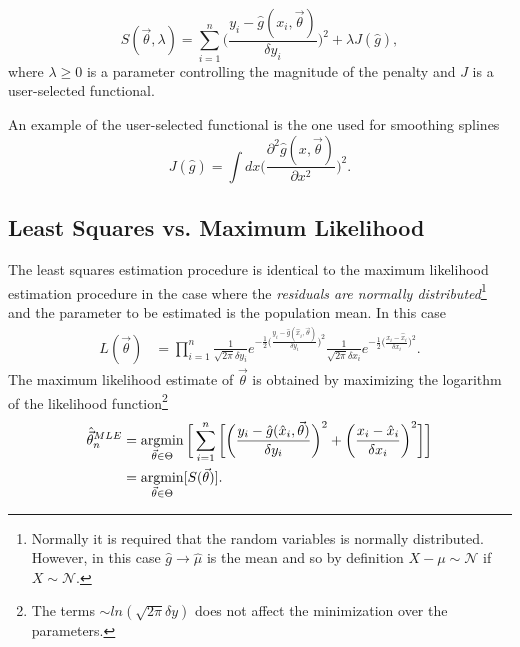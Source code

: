 \begin{equation}
	S(\vec{\theta},\lambda)=\sum_{i=1}^n\bigg(\frac{y_i-\hat{g}(x_i,\vec{\theta})}{\delta y_i}\bigg)^2+\lambda J(\hat{g}),
	\label{eq8p}
\end{equation} 
where $\lambda\geq 0$ is a parameter controlling the magnitude of the penalty and $J$ is a user-selected functional.
\begin{example}
	An example of the user-selected functional is the one used for smoothing splines
	\begin{equation}
		J(\hat{g})=\int dx \bigg(\frac{\partial ^2 \hat{g}(x,\vec{ \theta})}{\partial x^2}\bigg)^2.
	\end{equation}
\end{example}


\subsection{Least Squares vs. Maximum Likelihood}
The least squares estimation procedure is identical to the maximum likelihood estimation procedure in the case where the \emph{residuals are normally distributed}\footnote{Normally it is required that the random variables is normally distributed. However, in this case $\hat{g}\rightarrow \hat{\mu}$ is the mean and so by definition $X-\mu\sim \mathcal{N}$ if $X\sim \mathcal{N}$.} and the parameter to be estimated is the population mean. In this case
\begin{equation}
	\begin{split}
		L(\vec{\theta})&=\prod_{i=1}^n\frac{1}{\sqrt{2\pi}\delta y_i}e^{-\frac{1}{2}\big(\frac{y_i-\hat{g}(\hat{x}_i,\vec{\theta})}{\delta y_i}\big)^2}\frac{1}{\sqrt{2\pi}\delta x_i}e^{-\frac{1}{2}\big(\frac{x_i-\hat{x}_i}{\delta x_i}\big)^2}.
	\end{split}
\end{equation}
The maximum likelihood estimate of $\vec{\theta}$ is obtained by maximizing the logarithm of the likelihood function\footnote{The terms $\sim ln(\sqrt{2\pi}\delta y)$ does not affect the minimization over the parameters.} 
\begin{equation}
	\begin{split}
		\hat{\vec{\theta}}^{MLE}_n&=\operatorname*{argmin}_{\vec{\theta}\in \Theta}\bigg[\sum_{i=1}^n\bigg[\bigg(\frac{y_i-\hat{g}(\hat{x}_i,\vec{\theta})}{\delta y_i}\bigg)^2+\bigg(\frac{x_i-\hat{x}_i}{\delta x_i}\bigg)^2\bigg]\bigg]\\
		&=  \operatorname*{argmin}_{\vec{\theta}\in \Theta}[S(\vec{ \theta})].
	\end{split}
\end{equation}
